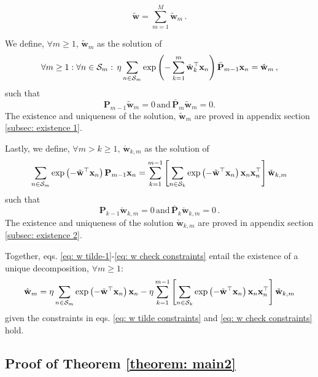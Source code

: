 \documentclass[twoside,11pt,english]{article}
\begin{document}
\[
\tilde{\mathbf{w}}=\sum_{m=1}^{M}\tilde{\mathbf{w}}_{m}\,.
\]

We define, $\forall m\geq1$, $\tilde{\mathbf{w}}_{m}$ as the solution
of 
\begin{equation}
\forall m\geq1:\forall n\in\mathcal{S}_{m}:\, \eta \sum_{n\in\mathcal{S}_{m}}\exp\left(-\sum_{k=1}^{m}\tilde{\mathbf{w}}_{k}^{\top}\mathbf{x}_{n}\right)\bar{\mathbf{P}}_{m-1}\mathbf{x}_{n}=\hat{\mathbf{w}}_{m}\,,\label{eq: w tilde-1}
\end{equation}
such that 
\begin{equation}
\mathbf{P}_{m-1}\tilde{\mathbf{w}}_{m}=0\,\mathrm{and}\,\bar{\mathbf{P}}_{m}\tilde{\mathbf{w}}_{m}=0.\label{eq: w tilde constraints}
\end{equation}
The existence and uniqueness of the solution, $\tilde{\mathbf{w}}_{m}$
are proved in appendix section \ref{subsec: existence 1}.

Lastly, we define, $\forall m>k\geq1$, $\check{\mathbf{w}}_{k,m}$
as the solution of 
\begin{equation}
\sum_{n\in\mathcal{S}_{m}}\exp\left(-\tilde{\mathbf{w}}^{\top}\mathbf{x}_{n}\right)\mathbf{P}_{m-1}\mathbf{x}_{n}=\sum_{k=1}^{m-1}\left[\sum_{n\in\mathcal{S}_{k}}\exp\left(-\tilde{\mathbf{w}}^{\top}\mathbf{x}_{n}\right)\mathbf{x}_{n}\mathbf{x}_{n}^{\top}\right]\check{\mathbf{w}}_{k,m}\label{eq: w check}
\end{equation}
such that
\begin{equation}
\mathbf{P}_{k-1}\check{\mathbf{w}}_{k,m}=0\,\mathrm{and}\,\mathbf{\bar{P}}_{k}\check{\mathbf{w}}_{k,m}=0\,.\label{eq: w check constraints}
\end{equation}
The existence and uniqueness of the solution $\check{\mathbf{w}}_{k,m}$
are proved in appendix section \ref{subsec: existence 2}. 

Together, eqs. \ref{eq: w tilde-1}-\ref{eq: w check constraints}
entail the existence of a unique decomposition, $\forall m\geq1:$
\begin{equation}
\hat{\mathbf{w}}_{m}=\eta \sum_{n\in\mathcal{S}_{m}}\exp\left(-\tilde{\mathbf{w}}^{\top}\mathbf{x}_{n}\right)\mathbf{x}_{n}-\eta \sum_{k=1}^{m-1}\left[\sum_{n\in\mathcal{S}_{k}}\exp\left(-\tilde{\mathbf{w}}^{\top}\mathbf{x}_{n}\right)\mathbf{x}_{n}\mathbf{x}_{n}^{\top}\right]\check{\mathbf{w}}_{k,m}\label{eq: w_hat full decomposition}
\end{equation}
given the constraints in eqs. \ref{eq: w tilde constraints} and \ref{eq: w check constraints}
hold. 

\subsection{Proof of Theorem \ref{theorem: main2}}
\end{document}
